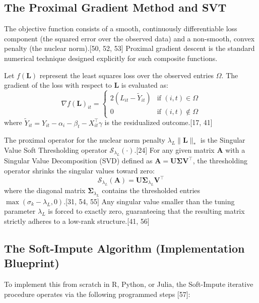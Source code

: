 \documentclass{article}
\begin{document}
\subsection{The Proximal Gradient Method and SVT}

The objective function consists of a smooth, continuously differentiable loss component (the squared error over the observed data) and a non-smooth, convex penalty (the nuclear norm).[50, 52, 53] Proximal gradient descent is the standard numerical technique designed explicitly for such composite functions.

Let $f(\mathbf{L})$ represent the least squares loss over the observed entries $\Omega$. The gradient of the loss with respect to $\mathbf{L}$ is evaluated as:
$$\nabla f(\mathbf{L})_{it} = \begin{cases} 2 (L_{it} - \tilde{Y}_{it}) & \text{if } (i,t) \in \Omega \\ 0 & \text{if } (i,t) \notin \Omega \end{cases}$$
where $\tilde{Y}_{it} = Y_{it} - \alpha_i - \beta_t - X_{it}^\top \gamma$ is the residualized outcome.[17, 41]

The proximal operator for the nuclear norm penalty $\lambda_L \|\mathbf{L}\|_*$ is the Singular Value Soft Thresholding operator $\mathcal{S}_{\lambda_L}(\cdot)$.[24] For any given matrix $\mathbf{A}$ with a Singular Value Decomposition (SVD) defined as $\mathbf{A} = \mathbf{U} \mathbf{\Sigma} \mathbf{V}^\top$, the thresholding operator shrinks the singular values toward zero:
$$\mathcal{S}_{\lambda_L}(\mathbf{A}) = \mathbf{U} \mathbf{\Sigma}_{\lambda_L} \mathbf{V}^\top$$
where the diagonal matrix $\mathbf{\Sigma}_{\lambda_L}$ contains the thresholded entries $\max(\sigma_k - \lambda_L, 0)$.[31, 54, 55] Any singular value smaller than the tuning parameter $\lambda_L$ is forced to exactly zero, guaranteeing that the resulting matrix strictly adheres to a low-rank structure.[41, 56]

\subsection{The Soft-Impute Algorithm (Implementation Blueprint)}

To implement this from scratch in R, Python, or Julia, the Soft-Impute iterative procedure operates via the following programmed steps [57]:
\end{document}
